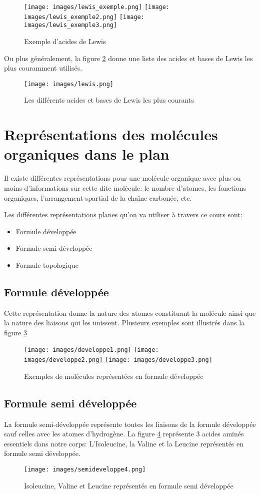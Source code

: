 \begin{figure}[htbp]
    \centering
    \texttt{[image: images/lewis\_exemple.png]}
    \texttt{[image: images/lewis\_exemple2.png]}
    \texttt{[image: images/lewis\_exemple3.png]}
    \caption{Exemple d'acides de Lewis}
    \label{fig:lexis_example}
\end{figure}

Ou plus généralement, la figure \ref{fig:lewis_list} donne une liste des acides et bases de Lewis les plus couramment utilisés. 
\begin{figure}[htbp]
    \centering
    \texttt{[image: images/lewis.png]} 
    \caption{Les différents acides et bases de Lewis les plus courants}
    \label{fig:lewis_list}
\end{figure}
\section{Représentations des molécules organiques dans le plan}
Il existe différentes représentations pour une molécule organique avec plus ou moins d'informations sur cette dite molécule: le nombre d'atomes, les fonctions organiques, l'arrangement spartial de la chaîne carbonée, etc.

Les différentes représentations planes qu'on va utiliser à travers ce cours sont:
\begin{itemize}
    \item Formule développée 
    \item Formule semi développée 
    \item Formule topologique
\end{itemize}
\subsection{Formule développée}
Cette représentation donne la nature des atomes constituant la molécule ainsi que la nature des liaisons qui les unissent. Plusieurs exemples sont illustrés dans la figure \ref{fig:developpe_examples}
\begin{figure}[!ht]
    \centering
    \texttt{[image: images/developpe1.png]}
    \texttt{[image: images/developpe2.png]}
    \texttt{[image: images/developpe3.png]}
    \caption{Exemples de molécules représentées en formule développée}
    \label{fig:developpe_examples}
\end{figure}
\subsection{Formule semi développée}
La formule semi-développée représente toutes les liaisons de la formule développée sauf celles avec les atomes d’hydrogène. La figure \ref{fig:semi_dev_example} représente 3 acides aminés essentiels dans notre corps: L'Isoleucine, la Valine et la Leucine représentés en formule semi développée.
\begin{figure}[htbp]
    \centering
    \texttt{[image: images/semideveloppe4.png]}
    \caption{Isoleucine, Valine et Leucine représentés en formule semi développée}
    \label{fig:semi_dev_example}
\end{figure}
